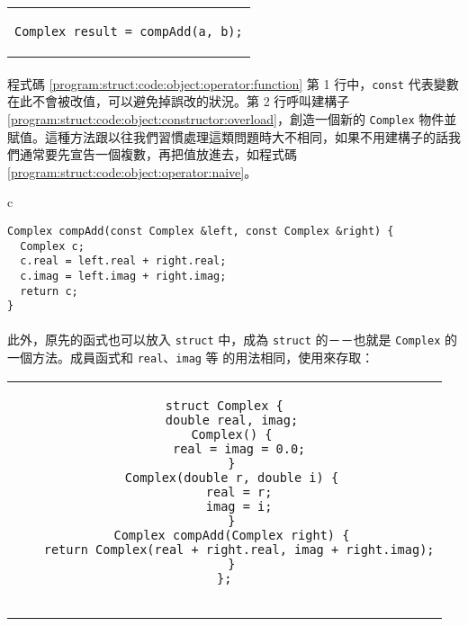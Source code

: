 \documentclass[12pt,a4paper,oneside]{report}
\begin{document}
\begin{CJK}{UTF8}{bkai}
\begin{code}[h!]
\begin{tabular}{c}
\begin{lstlisting}
Complex result = compAdd(a, b);
\end{lstlisting}
\end{tabular}
\caption{\lstinline!Complex! 相加}
\label{program:struct:code:object:operator:function}
\end{code}

\paragraph{}程式碼 \ref{program:struct:code:object:operator:function} 第 1 行中，\lstinline!const! 代表變數在此不會被改值，可以避免掉誤改的狀況。第 2 行呼叫建構子 \ref{program:struct:code:object:constructor:overload}，創造一個新的 \lstinline!Complex! 物件並賦值。這種方法跟以往我們習慣處理這類問題時大不相同，如果不用建構子的話我們通常要先宣告一個複數，再把值放進去，如程式碼 \ref{program:struct:code:object:operator:naive}。

\begin{code}[h!]
\centering
\begin{tabular}{c}
\begin{lstlisting}
Complex compAdd(const Complex &left, const Complex &right) {
  Complex c;
  c.real = left.real + right.real;
  c.imag = left.imag + right.imag;
  return c;
}
\end{lstlisting}
\end{tabular}
\caption{\lstinline!Complex! 相加}
\label{program:struct:code:object:operator:naive}
\end{code}

\paragraph{}此外，原先的函式也可以放入 \lstinline!struct! 中，成為 \lstinline!struct! 的－－也就是 \lstinline!Complex! 的一個方法。成員函式和 \lstinline!real!、\lstinline!imag! 等 的用法相同，使用來存取：

\begin{code}[h!]
\centering
\begin{tabular}{c}
\begin{lstlisting}
struct Complex {
  double real, imag;
  Complex() {
    real = imag = 0.0;
  }
  Complex(double r, double i) {
    real = r;
    imag = i;
  }
  Complex compAdd(Complex right) {
    return Complex(real + right.real, imag + right.imag);
  }
};


\end{lstlisting}
\end{tabular}
\end{code}
\end{CJK}
\end{document}
